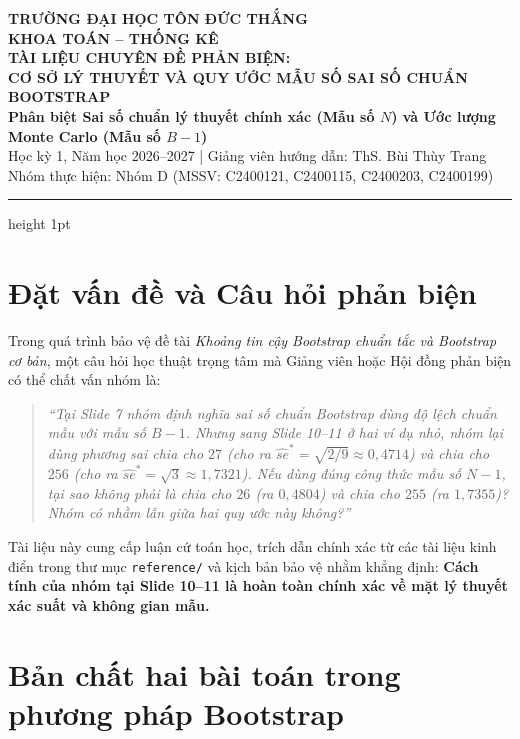 \documentclass[10pt,a4paper]{article}
\begin{document}
\begin{center}
    {\large\bfseries TRƯỜNG ĐẠI HỌC TÔN ĐỨC THẮNG}\\[0.1cm]
    {\bfseries KHOA TOÁN -- THỐNG KÊ}\\[0.25cm]
    {\Large\bfseries\color{primary} TÀI LIỆU CHUYÊN ĐỀ PHẢN BIỆN:\\CƠ SỞ LÝ THUYẾT VÀ QUY ƯỚC MẪU SỐ SAI SỐ CHUẨN BOOTSTRAP}\\[0.2cm]
    {\normalsize\textbf{Phân biệt Sai số chuẩn lý thuyết chính xác (Mẫu số $N$) và Ước lượng Monte Carlo (Mẫu số $B-1$)}}\\[0.15cm]
    {\small Học kỳ 1, Năm học 2026--2027 \quad | \quad Giảng viên hướng dẫn: ThS. Bùi Thùy Trang}\\[0.05cm]
    {\small Nhóm thực hiện: Nhóm D (MSSV: C2400121, C2400115, C2400203, C2400199)}
\end{center}

\vspace{0.15cm}
\hrule height 1pt
\vspace{0.3cm}

\section{Đặt vấn đề và Câu hỏi phản biện}

Trong quá trình bảo vệ đề tài \textit{Khoảng tin cậy Bootstrap chuẩn tắc và Bootstrap cơ bản}, một câu hỏi học thuật trọng tâm mà Giảng viên hoặc Hội đồng phản biện có thể chất vấn nhóm là:
\begin{quote}
\itshape
``Tại Slide 7 nhóm định nghĩa sai số chuẩn Bootstrap dùng độ lệch chuẩn mẫu với mẫu số $B-1$. Nhưng sang Slide 10--11 ở hai ví dụ nhỏ, nhóm lại dùng phương sai chia cho $27$ (cho ra $\widehat{se}^* = \sqrt{2/9} \approx 0{,}4714$) và chia cho $256$ (cho ra $\widehat{se}^* = \sqrt{3} \approx 1{,}7321$). Nếu dùng đúng công thức mẫu số $N-1$, tại sao không phải là chia cho $26$ (ra $0{,}4804$) và chia cho $255$ (ra $1{,}7355$)? Nhóm có nhầm lẫn giữa hai quy ước này không?''
\end{quote}

Tài liệu này cung cấp luận cứ toán học, trích dẫn chính xác từ các tài liệu kinh điển trong thư mục \texttt{reference/} và kịch bản bảo vệ nhằm khẳng định: \textbf{Cách tính của nhóm tại Slide 10--11 là hoàn toàn chính xác về mặt lý thuyết xác suất và không gian mẫu.}

\section{Bản chất hai bài toán trong phương pháp Bootstrap}
\end{document}
